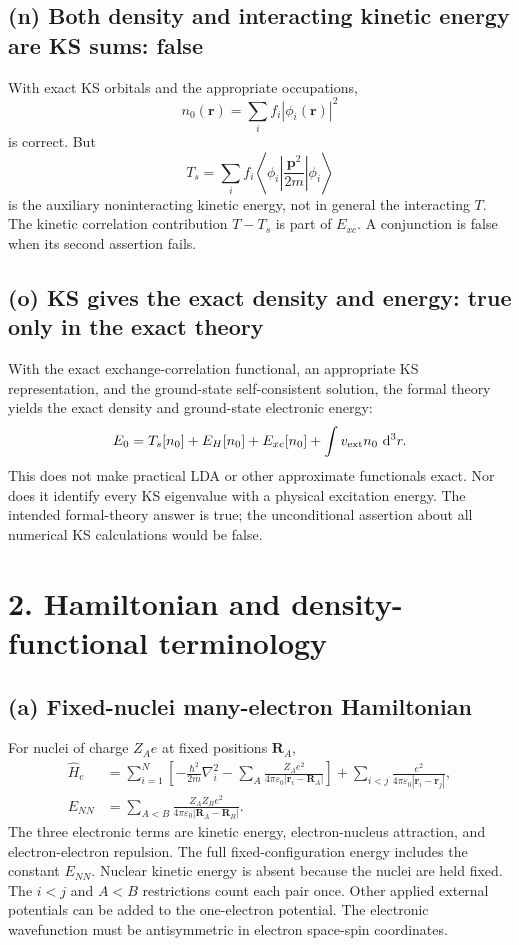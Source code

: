 \subsection*{(n) Both density and interacting kinetic energy are KS sums: false}
With exact KS orbitals and the appropriate occupations,
\[
n_0(\mathbf r)=\sum_i f_i|\phi_i(\mathbf r)|^2
\]
is correct. But
\[
T_s=\sum_i f_i\left\langle\phi_i\left|\frac{\mathbf p^2}{2m}\right|\phi_i\right\rangle
\]
is the auxiliary noninteracting kinetic energy, not in general the interacting $T$. The kinetic correlation contribution $T-T_s$ is part of $E_{xc}$. A conjunction is false when its second assertion fails.

\subsection*{(o) KS gives the exact density and energy: true only in the exact theory}
With the exact exchange-correlation functional, an appropriate KS representation, and the ground-state self-consistent solution, the formal theory yields the exact density and ground-state electronic energy:
\[
E_0=T_s[n_0]+E_H[n_0]+E_{xc}[n_0]+\int v_{\rm ext}n_0\,\mathop{}\!\mathrm{d}^3r.
\]
This does not make practical LDA or other approximate functionals exact. Nor does it identify every KS eigenvalue with a physical excitation energy. The intended formal-theory answer is true; the unconditional assertion about all numerical KS calculations would be false.

\section*{2. Hamiltonian and density-functional terminology}
\subsection*{(a) Fixed-nuclei many-electron Hamiltonian}
For nuclei of charge $Z_Ae$ at fixed positions $\mathbf R_A$,
\begin{align*}
\hat H_e&=\sum_{i=1}^N\left[-\frac{\hbar^2}{2m}\nabla_i^2
-\sum_A\frac{Z_Ae^2}{4\pi\varepsilon_0|\mathbf r_i-\mathbf R_A|}\right]
+\sum_{i<j}\frac{e^2}{4\pi\varepsilon_0|\mathbf r_i-\mathbf r_j|},\\
E_{NN}&=\sum_{A<B}\frac{Z_AZ_Be^2}{4\pi\varepsilon_0|\mathbf R_A-\mathbf R_B|}.
\end{align*}
The three electronic terms are kinetic energy, electron-nucleus attraction, and electron-electron repulsion. The full fixed-configuration energy includes the constant $E_{NN}$. Nuclear kinetic energy is absent because the nuclei are held fixed. The $i<j$ and $A<B$ restrictions count each pair once. Other applied external potentials can be added to the one-electron potential. The electronic wavefunction must be antisymmetric in electron space-spin coordinates.

